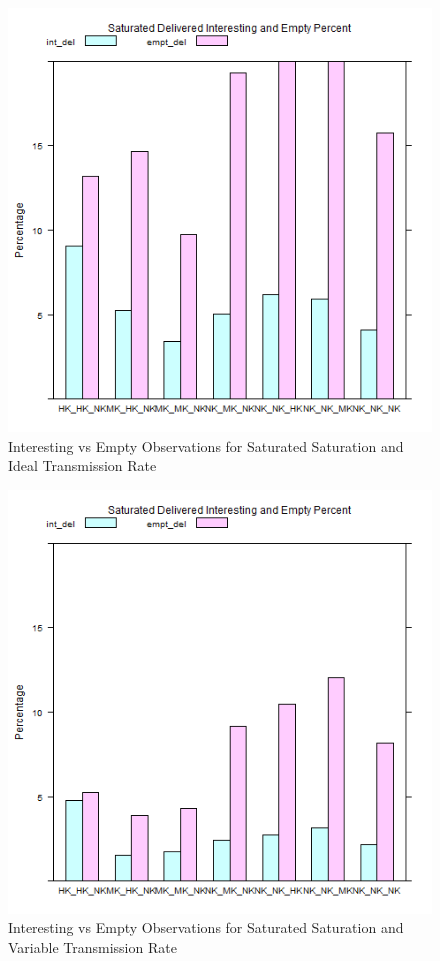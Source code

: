 	\begin{figure}[H]
	\centering
	\includegraphics[width=\textwidth]{Chap7/figures/plots/saturated_ideal/emptvsint_percent.png}
	\caption{Interesting vs Empty Observations for Saturated Saturation and Ideal Transmission Rate}
	\label{fig:sim:res:sat:ideal:emptint}
	\end{figure}

	\begin{figure}[H]
	\centering
	\includegraphics[width=\textwidth]{Chap7/figures/plots/saturated_variable/emptvsint_percent.png}
	\caption{Interesting vs Empty Observations for Saturated Saturation and Variable Transmission Rate}
	\label{fig:sim:res:sat:variable:emptint}
	\end{figure}
